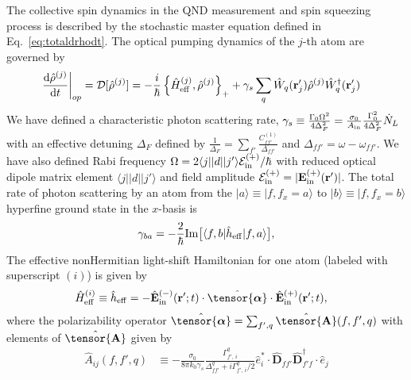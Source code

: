\documentclass[preprint,aps,pra,onecolumn,superscriptaddress]{revtex4-1} %
\newcommand{\dt}[1]{\frac{{\mathrm d} {#1}}{{\mathrm d}t}}
\def\br{\mathbf{r}}
\def\bra#1{\langle{#1}\rvert}%
\def\ket#1{\lvert{#1}\rangle}%
\newcommand{\poltens}{\hat{\tensor{\boldsymbol{\alpha}}}}
\begin{document}
\begin{appendix}
 
The collective spin dynamics in the QND measurement and spin squeezing process is described by the stochastic master equation defined in Eq.~\eqref{eq:totaldrhodt}. The optical pumping dynamics of the $ j $-th atom are governed by 
\begin{align}
\left.\dt{\hat{\rho}^{(j)}}\right|_{op} &= \mathcal{D}[\hat{\rho}^{(j)}]=-\frac{i}{\hbar}\left\{\hat{H}_{\rm eff}^{(j)},\hat{\rho}^{(j)} \right\}_+ + \gamma_s\sum_{q}\hat{W}_q(\br'_j)\hat{\rho}^{(j)}\hat{W}_q^\dagger(\br'_j) %
\end{align} 
We have defined a characteristic photon scattering rate, $\gamma_s \equiv \frac{\Gamma_0\Omega^2}{4\Delta_{F}^2}= \frac{\sigma_0}{A_{\rm in}}\frac{\Gamma_0^2}{4 \Delta_{F}^2} \dot{N}_L $ with an effective detuning $ \Delta_F $ defined by $ \frac{1}{\Delta_F}=\sum_{f'}\frac{C_{ff'}^{(1)}}{\Delta_{ff'}} $ and $ \Delta_{ff'}=\omega-\omega_{ff'} $.
We have also defined Rabi frequency $ \Omega=2\bra{j}|d|\ket{j'}\mathcal{E}^{(+)}_{\rm in}/\hbar $ with reduced optical dipole matrix element $\bra{j}|d|\ket{j'}$ and field amplitude $ \mathcal{E}^{(+)}_{\rm in}=|\mathbf{E}_{\rm in}^{(+)}(\br')| $.
The total rate of photon scattering by an atom from the $\ket{a}\equiv \ket{f,f_x=a}$ to $ \ket{b}\equiv\ket{f,f_x=b} $ hyperfine ground state in the $x$-basis is
	\begin{equation}\label{Eq::gammaf}
		\gamma_{ba}=- \frac{2}{\hbar} {\rm Im} \big[ \bra{f,b} \hat{h}_{\rm eff}\ket{f,a} \big] ,
	\end{equation}
The effective nonHermitian light-shift Hamiltonian for one atom (labeled with superscript $ (i) $) is given by
\begin{align}
\hat{H}_{\rm eff}^{(i)} \equiv \hat{h}_{\rm eff}&= - \hat{\mathbf{E}}^{(-)}_{\rm in}(\mathbf{r}' ; t ) \cdot \poltens \cdot \hat{\mathbf{E}}^{(+)}_{\rm in}(\mathbf{r}' ;t ),
\end{align}
where the polarizability operator $  \poltens=\sum_{f',q}\hat{\tensor{\mathbf{A}}}(f,f',q)$ with elements of $ \hat{\tensor{\mathbf{A}}} $ given by
\begin{align} \label{Eq::PolarizabilityIrrep}
		\hat{A}_{ij}(f,f',q)&\equiv -\frac{\sigma_0}{8\pi k_0\gamma_s}\frac{\Gamma_{f'\!\!,\, i}^q}{\Delta_{ff'}^q+i\Gamma_{f'\!\!,\, i}^q/2}\hat{e}_i^*\cdot\hat{\mathbf{D}}_{ff'}\hat{\mathbf{D}}_{f'f}^\dagger \cdot \hat{e}_j \\

\end{align}
\end{appendix}
\end{document}
